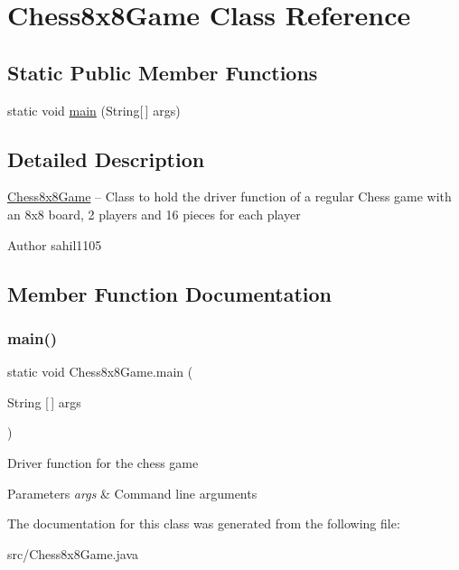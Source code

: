 \hypertarget{class_chess8x8_game}{}\section{Chess8x8\+Game Class Reference}
\label{class_chess8x8_game}
\subsection*{Static Public Member Functions}
\begin{DoxyCompactItemize}
\item 
static void \mbox{\hyperlink{class_chess8x8_game_a61bf2fced5a4e57e750180eda921618b}{main}} (String\mbox{[}$\,$\mbox{]} args)
\end{DoxyCompactItemize}


\subsection{Detailed Description}
\mbox{\hyperlink{class_chess8x8_game}{Chess8x8\+Game}} -- Class to hold the driver function of a regular Chess game with an 8x8 board, 2 players and 16 pieces for each player \begin{DoxyAuthor}{Author}
sahil1105 
\end{DoxyAuthor}


\subsection{Member Function Documentation}
\mbox{\label{class_chess8x8_game_a61bf2fced5a4e57e750180eda921618b}} 
\subsubsection{\texorpdfstring{main()}{main()}}
{\footnotesize\ttfamily static void Chess8x8\+Game.\+main (\begin{DoxyParamCaption}\item[{String \mbox{[}$\,$\mbox{]}}]{args }\end{DoxyParamCaption})\hspace{0.3cm}{\ttfamily [static]}}

Driver function for the chess game 
\begin{DoxyParams}{Parameters}
{\em args} & Command line arguments \\
\hline
\end{DoxyParams}


The documentation for this class was generated from the following file\+:\begin{DoxyCompactItemize}
\item 
src/Chess8x8\+Game.\+java\end{DoxyCompactItemize}
